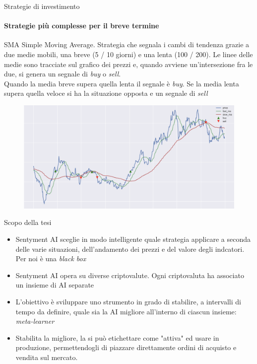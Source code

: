 \documentclass{beamer}
\begin{document}
\begin{frame}{Strategie di investimento}
\framesubtitle{Strategie più complesse per il breve termine}
\begin{itemize}
    \begin{block}{SMA}
    Simple Moving Average. Strategia che segnala i cambi di tendenza grazie a due medie mobili, una breve (5 / 10 giorni) e una lenta (100 / 200). Le linee delle medie sono tracciate sul grafico dei prezzi e, quando avviene un'intersezione fra le due, si genera un segnale di \textit{buy} o \textit{sell}.\\ Quando la media breve supera quella lenta il segnale è \textit{buy}. Se la media lenta supera quella veloce si ha la situazione opposta e un segnale di \textit{sell}
    \end{block}
    \begin{figure}
        \centering
        \includegraphics[width=.5\linewidth]{moving_avg2}
    \end{figure}
\end{itemize}
\end{frame}

\begin{frame}{Scopo della tesi}
\begin{itemize}
\item Sentyment AI sceglie in modo intelligente quale strategia applicare a seconda delle varie situazioni,
dell'andamento dei prezzi e del valore degli indcatori. Per noi è una \textit{black box}
\item Sentyment AI opera su diverse criptovalute. Ogni criptovaluta ha associato un insieme di AI separate
\item L'obiettivo è sviluppare uno strumento in grado di stabilire, a intervalli di tempo da definire,
quale sia la AI migliore all'interno di ciascun insieme: \textit{meta-learner}
\item Stabilita la migliore, la si può etichettare come "attiva" ed usare in produzione, permettendogli di piazzare direttamente ordini di acquisto e vendita sul mercato.
\end{itemize}
\end{frame}
\end{document}
